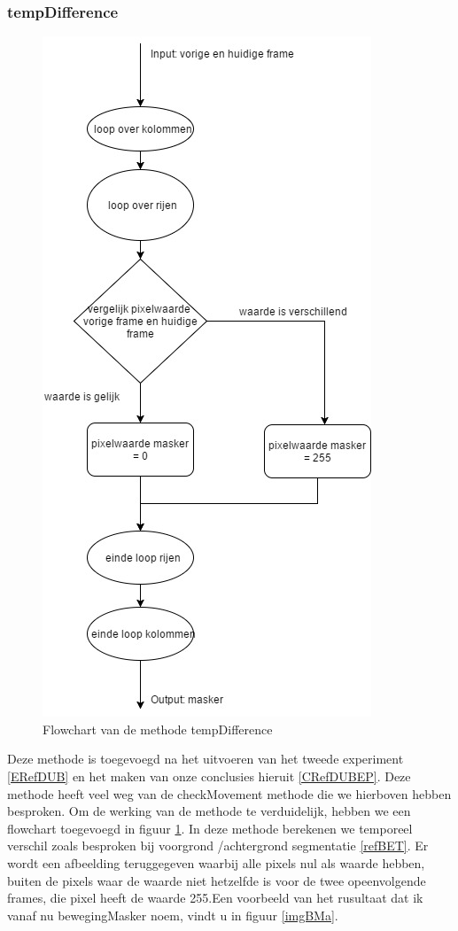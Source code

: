 \subsubsection{tempDifference}
\begin{figure}[hbp]
	\includegraphics[scale=0.45]{FlowChart_TempDifference}
	\caption{Flowchart van de methode tempDifference}
	\label{imgFCTDi}
\end{figure}
Deze methode is toegevoegd na het uitvoeren van het tweede experiment \ref{ERefDUB} en het maken van onze conclusies hieruit \ref{CRefDUBEP}. Deze methode heeft veel weg van de checkMovement methode die we hierboven hebben besproken. Om de werking van de methode te verduidelijk, hebben we een flowchart toegevoegd in figuur \ref{imgFCTDi}. In deze methode berekenen we temporeel verschil zoals besproken bij voorgrond /achtergrond segmentatie \ref{refBET}. Er wordt een afbeelding teruggegeven waarbij alle pixels nul als waarde hebben, buiten de pixels waar de waarde niet hetzelfde is voor de twee opeenvolgende frames, die pixel heeft de waarde 255.Een voorbeeld van het rusultaat dat ik vanaf nu bewegingMasker noem, vindt u in figuur \ref{imgBMa}. \\
